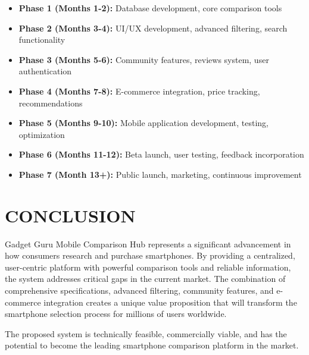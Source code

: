 \documentclass[12pt]{article}
\begin{document}
\begin{itemize}
    \item \textbf{Phase 1 (Months 1-2):} Database development, core comparison tools
    \item \textbf{Phase 2 (Months 3-4):} UI/UX development, advanced filtering, search functionality
    \item \textbf{Phase 3 (Months 5-6):} Community features, reviews system, user authentication
    \item \textbf{Phase 4 (Months 7-8):} E-commerce integration, price tracking, recommendations
    \item \textbf{Phase 5 (Months 9-10):} Mobile application development, testing, optimization
    \item \textbf{Phase 6 (Months 11-12):} Beta launch, user testing, feedback incorporation
    \item \textbf{Phase 7 (Month 13+):} Public launch, marketing, continuous improvement
\end{itemize}

\section{CONCLUSION}

Gadget Guru Mobile Comparison Hub represents a significant advancement in how consumers research and purchase smartphones. By providing a centralized, user-centric platform with powerful comparison tools and reliable information, the system addresses critical gaps in the current market. The combination of comprehensive specifications, advanced filtering, community features, and e-commerce integration creates a unique value proposition that will transform the smartphone selection process for millions of users worldwide.

The proposed system is technically feasible, commercially viable, and has the potential to become the leading smartphone comparison platform in the market.
\end{document}
